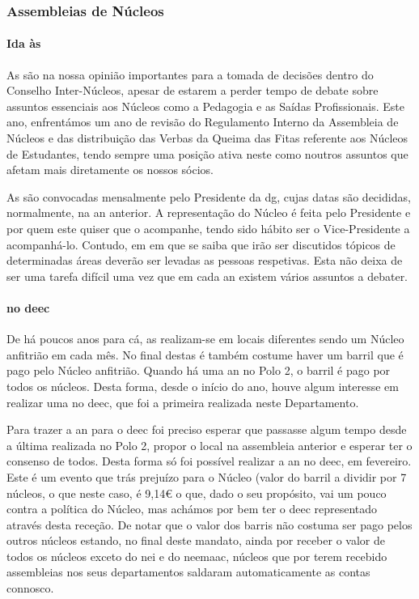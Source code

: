 
\subsubsection{Assembleias de Núcleos}

\paragraph{Ida às }

As  são na nossa opinião importantes para a tomada de decisões dentro do Conselho Inter-Núcleos, apesar de estarem a perder tempo de debate sobre assuntos essenciais aos Núcleos como a Pedagogia e as Saídas Profissionais. Este ano, enfrentámos um ano de revisão do Regulamento Interno da Assembleia de Núcleos e das distribuição das Verbas da Queima das Fitas referente aos Núcleos de Estudantes, tendo sempre uma posição ativa neste como noutros assuntos que afetam mais diretamente os nossos sócios.

As  são convocadas mensalmente pelo Presidente da \acrlong{dg}, cujas datas são decididas, normalmente, na \acrshort{an} anterior. A representação do Núcleo é feita pelo Presidente e por quem este quiser que o acompanhe, tendo sido hábito ser o Vice-Presidente a acompanhá-lo. Contudo, em  em que se saiba que irão ser discutidos tópicos de determinadas áreas deverão ser levadas as pessoas respetivas. Esta não deixa de ser uma tarefa difícil uma vez que em cada \acrshort{an} existem vários assuntos a debater.

\paragraph{ no \acrshort{deec}}

De há poucos anos para cá, as  realizam-se em locais diferentes sendo um Núcleo anfitrião em cada mês. No final destas  é também costume haver um barril que é pago pelo Núcleo anfitrião. Quando há uma \acrshort{an} no Polo 2, o barril é pago por todos os núcleos. Desta forma, desde o início do ano, houve algum interesse em realizar uma no \acrshort{deec}, que foi a primeira realizada neste Departamento.

Para trazer a \acrshort{an} para o \acrshort{deec} foi preciso esperar que passasse algum tempo desde a última realizada no Polo 2, propor o local na assembleia anterior e esperar ter o consenso de todos. Desta forma só foi possível realizar a \acrshort{an} no \acrshort{deec}, em fevereiro. Este é um evento que trás prejuízo para o Núcleo (valor do barril a dividir por 7 núcleos, o que neste caso, é 9,14€ o que, dado o seu propósito, vai um pouco contra a política do Núcleo, mas achámos por bem ter o \acrshort{deec} representado através desta receção. De notar que o valor dos barris não costuma ser pago pelos outros núcleos estando, no final deste mandato, ainda por receber o valor de todos os núcleos exceto do \acrshort{nei} e do \acrshort{neemaac}, núcleos que por terem recebido assembleias nos seus departamentos saldaram automaticamente as contas connosco.


